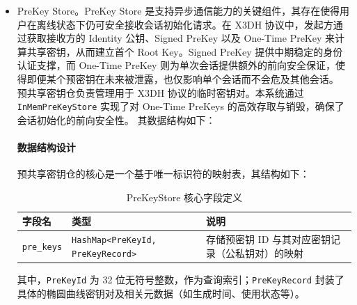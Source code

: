 \begin{itemize}
\paragraph{安全逻辑分析}
\label{subsec:keystore_security}

在本实现中，\texttt{is\_trusted\_identity} 遵循无记录即信任原则：
\begin{itemize}
    \item 若 \texttt{known\_keys} 中不存在对应地址，则默认信任该密钥并允许建立连接；
    \item 若已存在记录但传入身份密钥不匹配，则判定为不可信，拒绝通信。
\end{itemize}
        这样的策略可以有效防止身份冒充与中间人攻击，同时兼顾可用性。对于高安全场景，可扩展为由上层应用人工确认后才信任的模式，但本系统采用标准 TOFU 模型以保持与 Signal 协议兼容。

    \item PreKey Store。PreKey Store 是支持异步通信能力的关键组件，其存在使得用户在离线状态下仍可安全接收会话初始化请求。在 X3DH 协议中，发起方通过获取接收方的 Identity 公钥、Signed PreKey 以及 One-Time PreKey 来计算共享密钥，从而建立首个 Root Key。Signed PreKey 提供中期稳定的身份认证支撑，而 One-Time PreKey 则为单次会话提供额外的前向安全保证，使得即便某个预密钥在未来被泄露，也仅影响单个会话而不会危及其他会话。
       预共享密钥仓负责管理用于 X3DH 协议的临时密钥对。本系统通过 \texttt{InMemPreKeyStore} 实现了对 One-Time PreKeys 的高效存取与销毁，确保了会话初始化的前向安全性。
其数据结构如下：
    \paragraph{数据结构设计}
    \label{par:prekey_data}
    预共享密钥仓的核心是一个基于唯一标识符的映射表，其结构如下：
    
    \begin{table}[htbp]
    \centering
    \caption{PreKeyStore 核心字段定义}
    \label{tab:prekey_fields}
    \small
    \begin{tabular}{@{}l l p{5.8cm}@{}}
    \toprule
    \textbf{字段名} & \textbf{类型} & \textbf{说明} \\
    \midrule
    \texttt{pre\_keys} & \texttt{HashMap<PreKeyId, PreKeyRecord>} & 存储预密钥 ID 与其对应密钥记录（公私钥对）的映射 \\
    \bottomrule
    \end{tabular}
    \end{table}
    
    其中，\texttt{PreKeyId} 为 32 位无符号整数，作为查询索引；\texttt{PreKeyRecord} 封装了具体的椭圆曲线密钥对及相关元数据（如生成时间、使用状态等）。
    

\end{itemize}
